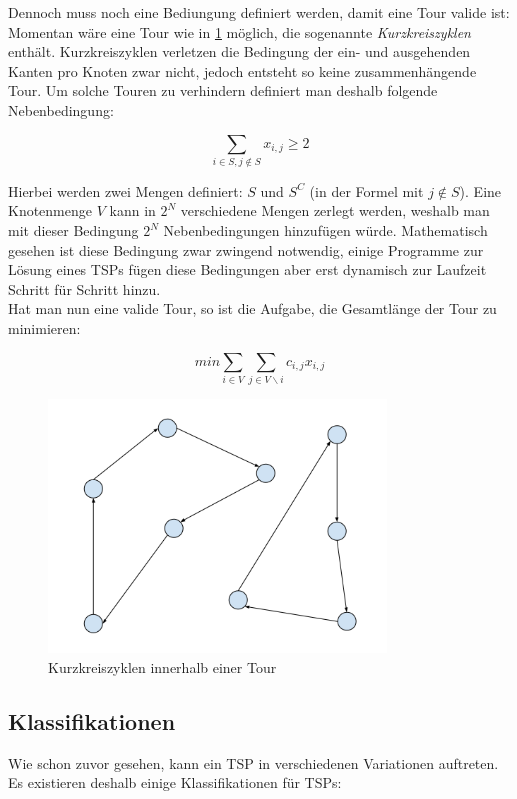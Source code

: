 \documentclass[a4paper, 11pt]{article}
\begin{document}
Dennoch muss noch eine Bediungung definiert werden, damit eine Tour valide ist:
Momentan wäre eine Tour wie in \ref{fig:short_cycles} möglich, die sogenannte
\textit{Kurzkreiszyklen} enthält. Kurzkreiszyklen verletzen die Bedingung der
ein- und ausgehenden Kanten pro Knoten zwar nicht, jedoch entsteht so keine
zusammenhängende Tour. Um solche Touren zu verhindern definiert man deshalb
folgende Nebenbedingung:

$$\sum_{i \in S, j \notin S}x_{i,j} \geq 2$$

Hierbei werden zwei Mengen definiert: $S$ und $S^C$ (in der Formel mit
$j \notin S$). Eine Knotenmenge $V$ kann in $2^N$ verschiedene Mengen zerlegt
werden, weshalb man mit dieser Bedingung $2^N$ Nebenbedingungen hinzufügen
würde. Mathematisch gesehen ist diese Bedingung zwar zwingend notwendig, 
einige Programme zur Lösung eines TSPs fügen diese Bedingungen aber erst
dynamisch zur Laufzeit Schritt für Schritt hinzu. \\

Hat man nun eine valide Tour, so ist die Aufgabe, die Gesamtlänge der Tour
zu minimieren:

$$min\sum_{i \in V} \sum_{j \in V \backslash i} c_{i,j}x_{i,j}$$

\begin{figure}[p]
    \centering
    \includegraphics[width=0.8\textwidth]{kurzkreiszyklen.png}
    \caption{Kurzkreiszyklen innerhalb einer Tour}
    \label{fig:short_cycles}
\end{figure}

\subsection{Klassifikationen}

Wie schon zuvor gesehen, kann ein TSP in verschiedenen Variationen auftreten.
Es existieren deshalb einige Klassifikationen für TSPs:
\end{document}
